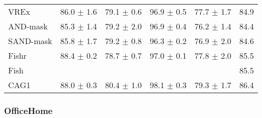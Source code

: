 \documentclass{article}
\begin{document}
\begin{center}
{\begin{tabular}{lccccc}
VREx                 & 86.0 $\pm$ 1.6       & 79.1 $\pm$ 0.6       & 96.9 $\pm$ 0.5       & 77.7 $\pm$ 1.7       & 84.9                 \\
AND-mask             & 85.3 $\pm$ 1.4       & 79.2 $\pm$ 2.0       & 96.9 $\pm$ 0.4       & 76.2 $\pm$ 1.4       & 84.4                 \\
SAND-mask            & 85.8 $\pm$ 1.7       & 79.2 $\pm$ 0.8       & 96.3 $\pm$ 0.2       & 76.9 $\pm$ 2.0       & 84.6                 \\
Fishr                & 88.4 $\pm$ 0.2       & 78.7 $\pm$ 0.7       & 97.0 $\pm$ 0.1       & 77.8 $\pm$ 2.0       & 85.5                 \\
Fish                 &                      &                      &                      &                      & 85.5                 \\
\midrule
CAG1                 & 88.0 $\pm$ 0.3       & 80.4 $\pm$ 1.0       & 98.1 $\pm$ 0.3       & 79.3 $\pm$ 1.7       & 86.4                 \\
\bottomrule
\end{tabular}}
\end{center}

 

\subsubsection{OfficeHome}
\end{document}
